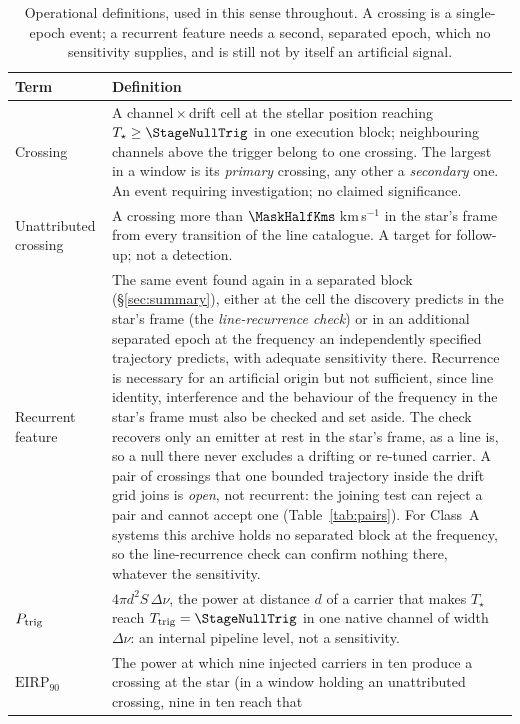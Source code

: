\begin{table}
\centering
\caption{Operational definitions, used in this sense throughout. A crossing is
a single-epoch event; a recurrent feature needs a second, separated epoch,
which no sensitivity supplies, and is still not by itself an artificial
signal.}
\label{tab:quantities}
\small
\begin{tabular}{@{}p{}p{}@{}}
\hline
Term & Definition \\
\hline
Crossing &
A channel\,$\times$\,drift cell at the stellar position reaching
$T_\star\geq\StageNullTrig$ in one execution block; neighbouring channels
above the trigger belong to one crossing. The largest in a window is its
\emph{primary} crossing, any other a \emph{secondary} one. An event requiring
investigation; no claimed significance. \\
Unattributed crossing &
A crossing more than $\MaskHalfKms$\,km\,s$^{-1}$ in the star's frame from
every transition of the line catalogue. A target for follow-up; not a
detection. \\
Recurrent feature &
The same event found again in a separated block (\S\ref{sec:summary}),
either at the cell the discovery predicts in the star's frame (the
\emph{line-recurrence check}) or in an additional separated epoch at the
frequency an independently specified trajectory predicts, with adequate
sensitivity there. Recurrence is necessary for an artificial origin but not
sufficient, since line identity, interference and the behaviour of the
frequency in the star's frame must also be checked and set aside. The check recovers only an emitter at rest in the star's
frame, as a line is, so a null there never excludes a drifting or re-tuned
carrier. A pair of crossings that one bounded trajectory inside the drift
grid joins is \emph{open}, not recurrent: the joining test can reject a pair
and cannot accept one (Table~\ref{tab:pairs}). For \ZcNoRepSys{} Class~A
systems this archive holds no separated block at the frequency, so the
line-recurrence check can confirm nothing there, whatever the sensitivity. \\
$P_{\rm trig}$ &
$4\pi d^{2}S\,\Delta\nu$, the power at distance $d$ of a carrier that makes
$T_\star$ reach $T_{\rm trig}=\StageNullTrig$ in one native channel of width
$\Delta\nu$: an internal pipeline level, not a sensitivity. \\
$\mathrm{EIRP}_{90}$ &
The power at which nine injected carriers in ten produce a crossing at the
star (in a window holding an unattributed crossing, nine in ten reach that

\end{tabular}
\end{table}
